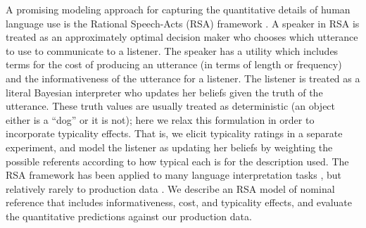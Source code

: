 \documentclass[10pt,letterpaper]{article}
\newcommand{\jd}[1]{\textcolor{Blue}{[jd: #1]}}
\newcommand{\ndg}[1]{\textcolor{Green}{[ndg: #1]}}
\begin{document}

A promising modeling approach for capturing the quantitative details of human language use is the Rational Speech-Acts (RSA) framework \cite{frank2012, goodmanstuhlmueller2013}. 
A speaker in RSA is treated as an approximately optimal decision maker who chooses which utterance to use to communicate to a listener.
The speaker has a utility which includes terms for the cost of producing an utterance (in terms of length or frequency) and the informativeness of the utterance for a listener.
The listener is treated as a literal Bayesian interpreter who updates her beliefs given the truth of the utterance.
These truth values are usually treated as deterministic (an object either is a ``dog'' or it is not); here we relax this formulation in order to incorporate typicality effects. 
That is, we elicit typicality ratings in a separate experiment, and model the listener as updating her beliefs by weighting the possible referents according to how typical each is for the description used.
%
The RSA framework has been applied to many language interpretation tasks \cite{goodmanstuhlmueller2013,kao2014,Bergen2016}, but relatively rarely to production data \cite<but see>{franke2014, Orita2015}.
We describe an RSA model of nominal reference that includes informativeness, cost, and typicality effects, and evaluate the quantitative predictions against our production data.


\end{document}
